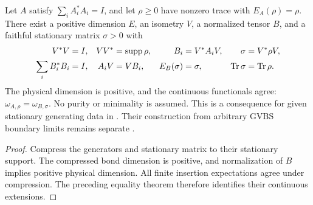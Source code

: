 \begin{lemma}
    \label{thm:stationary_support_quasi_local_state_equality}
    \leanok
    Let $A$ satisfy $\sum_iA_i^*A_i=I$, and let $\rho\geq0$ have nonzero
    trace with $E_A(\rho)=\rho$. There exist a positive dimension $E$,
    an isometry $V$, a normalized tensor $B$, and a faithful stationary
    matrix $\sigma>0$ with
    \begin{align}
        V^*V                    & =I,                           & VV^*   & =\operatorname{supp}\rho, &
        B_i                     & =V^*A_iV,                     & \sigma & =V^*\rho V,\notag           \\
        \sum_iB_i^*B_i          & =I,                           & A_iV   & =VB_i,                    &
        E_B(\sigma)             & =\sigma,                      &
        \operatorname{Tr}\sigma & =\operatorname{Tr}\rho.\notag
    \end{align}
    The physical dimension is positive, and the continuous
    functionals agree: $\omega_{A,\rho}=\omega_{B,\sigma}$.
    No purity or minimality is assumed. This is a consequence for given
    stationary generating data in \cite[Section~3]{Nachtergaele1996Spectral}.
    Their construction from arbitrary GVBS boundary limits remains separate
    \cite{gap:nachtergaele96_infinite_volume_ground_projection}.
\end{lemma}
\begin{proof}\leanok
    Compress the generators and stationary matrix to their stationary
    support. The compressed bond dimension is positive, and normalization
    of $B$ implies positive physical dimension. All finite insertion
    expectations agree under compression. The preceding equality theorem
    therefore identifies their continuous extensions.
\end{proof}

